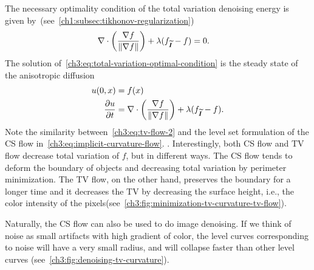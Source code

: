 The necessary optimality condition of the total variation denoising energy is given by~(see~\cref{ch1:subsec:tikhonov-regularization})
\begin{align}
	\nabla \cdot \left( \frac{\nabla f}{\lVert\nabla f\rVert} \right) + \lambda( f_{\widetilde{\bm{I}}} - f ) &= 0.
	\label{ch3:eq:total-variation-optimal-condition}
\end{align}
%
The solution of~\cref{ch3:eq:total-variation-optimal-condition} is the steady state of the  anisotropic diffusion
\begin{align}
	u(0,x) &= f(x) 	\label{ch3:eq:tv-flow-1} \\
	\frac{\partial u}{\partial t} &= \nabla \cdot \left( \frac{\nabla f}{\lVert\nabla f\rVert} \right) + \lambda( f_{\widetilde{\bm{I}}} - f ). \label{ch3:eq:tv-flow-2}
\end{align}
%
Note the similarity between~\cref{ch3:eq:tv-flow-2} and the level set formulation of the CS flow in~\cref{ch3:eq:implicit-curvature-flow}. . Interestingly, both CS flow and TV flow decrease total variation of $f$, but in different ways. The CS flow tends to deform the boundary of objects and decreasing total variation by perimeter minimization. The TV flow, on the other hand, preserves the boundary for a longer time and it decreases the TV by decreasing the surface height, i.e., the color intensity of the pixels(see~\cref{ch3:fig:minimization-tv-curvature-tv-flow}).

Naturally, the CS flow can also be used to do image denoising. If we think of noise as small artifacts with high gradient of color, the level curves corresponding to noise will have a very small radius, and will collapse faster than other level curves (see~\cref{ch3:fig:denoising-tv-curvature}). 


